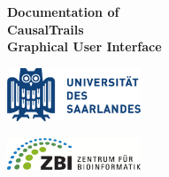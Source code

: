 \def\university{Universit\"{a}t des Saarlandes}
\def\institute{Center for Bioinformatics}
\def\pa{Documentation of}
\def\pb{CausalTrails}
\def\pc{Graphical User Interface}

\vspace{.2em}  
\def\author{Florian Schmidt}
\def\date{March 2015}

\begin{titlepage}
  \begin{minipage}{\textwidth}
    \begin{center}
    \vspace{3.5cm}
    {\huge\textbf{\pa}}\\
    \vspace{0.5cm}
    {\huge\textbf{\pb}}\\
    \vspace{0.5cm}
    {\huge\textbf{\pc}}\\
    \vspace{9cm}
    \end{center}
  \end{minipage}
    
    \begin{minipage}{\textwidth}
        \begin{center}
        \begin{minipage}{4cm}
	  \begin{center}
	    \includegraphics[width=4cm]{pic/Logo-Universitaet_des_Saarlandes.eps}\\ 
	    \end{center}
        \end{minipage}
        \hspace{1cm}
        \begin{minipage}{6cm}
        \begin{center}
            \includegraphics[width=4cm, angle=270]{pic/zbi-logo.eps}	
            \vspace{0.5cm}
	    \end{center}
        \end{minipage}
        
     
        \end{center}
    \end{minipage}

\end{titlepage}
